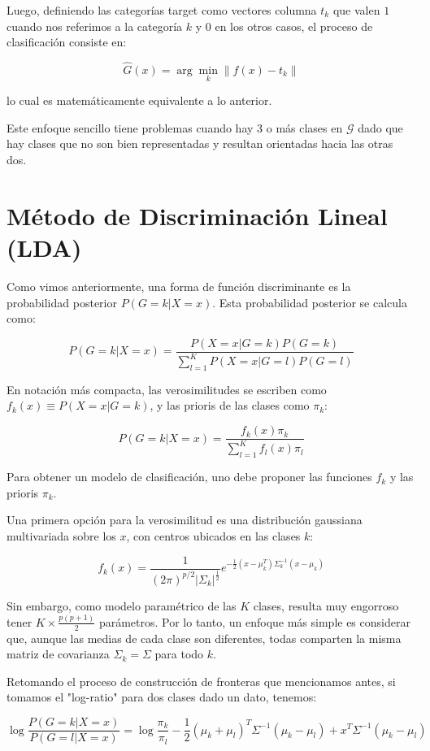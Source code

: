 \documentclass[aps,onecolumn,12pt,notitlepage]{revtex4-1}
\begin{document}
Luego, definiendo las categorías target como vectores columna \(t_k\) que valen \(1\) cuando nos referimos a la categoría \(k\) y \(0\) en los otros casos, el proceso de clasificación consiste en:

\[
\hat{G}(x) = \arg\min_{k} \left\| f(x) - t_k \right\|
\]

lo cual es matemáticamente equivalente a lo anterior.

Este enfoque sencillo tiene problemas cuando hay 3 o más clases en \(\mathcal{G}\) dado que hay clases que no son bien representadas y resultan orientadas hacia las otras dos.

\section*{Método de Discriminación Lineal (LDA)}

Como vimos anteriormente, una forma de función discriminante es la probabilidad posterior \(P(G=k|X=x)\). Esta probabilidad posterior se calcula como:

\[
P(G=k|X=x) = \frac{P(X=x|G=k)P(G=k)}{\sum_{l=1}^{K} P(X=x|G=l)P(G=l)}
\]

En notación más compacta, las verosimilitudes se escriben como \(f_k(x) \equiv P(X=x|G=k)\), y las prioris de las clases como \(\pi_k\):

\[
P(G=k|X=x) = \frac{f_k(x)\pi_k}{\sum_{l=1}^{K} f_l(x)\pi_l}
\]

Para obtener un modelo de clasificación, uno debe proponer las funciones \(f_k\) y las prioris \(\pi_k\).

Una primera opción para la verosimilitud es una distribución gaussiana multivariada sobre los \(x\), con centros ubicados en las clases \(k\):

\[
f_k(x) = \frac{1}{(2\pi)^{p/2} |\Sigma_k|^{\frac{1}{2}}}e^{-\frac{1}{2}(x-\mu_k^T)\Sigma_k^{-1}(x-\mu_k)}
\]

Sin embargo, como modelo paramétrico de las \(K\) clases, resulta muy engorroso tener \(K \times \frac{p(p+1)}{2}\) parámetros. Por lo tanto, un enfoque más simple es considerar que, aunque las medias de cada clase son diferentes, todas comparten la misma matriz de covarianza \(\Sigma_k = \Sigma\) para todo \(k\).

Retomando el proceso de construcción de fronteras que mencionamos antes, si tomamos el "log-ratio" para dos clases dado un dato, tenemos:

\[
\log \frac{P(G=k|X=x)}{P(G=l|X=x)} = \log \frac{\pi_k}{\pi_l} - \frac{1}{2}(\mu_k+\mu_l)^T\Sigma^{-1}(\mu_k- \mu_l) + x^T\Sigma^{-1}(\mu_k-\mu_l)
\]
\end{document}
